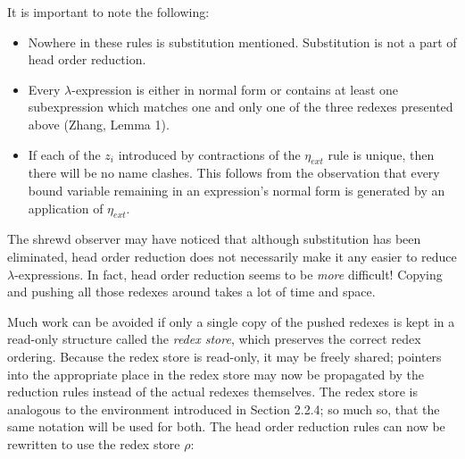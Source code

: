 It is important to note the following:

\begin{itemize}
\item Nowhere in these rules is substitution mentioned. Substitution is not a
part of head order reduction.
\item Every \(\lambda\)-expression is either in normal form or contains at
least one subexpression which matches one and only one of the three redexes
presented above (Zhang, Lemma 1).
\item If each of the \(z_i\) introduced by contractions of the \(\eta_{ext}\)
rule is unique, then there will be no name clashes. This follows from the
observation that every bound variable remaining in an expression's normal form
is generated by an application of \(\eta_{ext}\).
\end{itemize}

The shrewd observer may have noticed that although substitution has been
eliminated, head order reduction does not necessarily make it any easier to
reduce \(\lambda\)-expressions. In fact, head order reduction seems to be
\emph{more} difficult! Copying and pushing all those redexes around takes a lot
of time and space.

Much work can be avoided if only a single copy of the pushed redexes is kept in
a read-only structure called the \emph{redex store}, which preserves the correct
redex ordering. Because the redex store is read-only, it may be freely shared;
pointers into the appropriate place in the redex store may now be propagated by
the reduction rules instead of the actual redexes themselves. The redex store is
analogous to the environment introduced in Section 2.2.4; so much so, that the
same notation will be used for both. The head order reduction rules can now be
rewritten to use the redex store \(\rho\):

